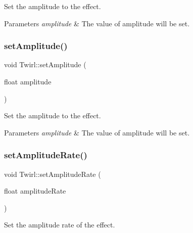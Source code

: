 Set the amplitude to the effect. 


\begin{DoxyParams}{Parameters}
{\em amplitude} & The value of amplitude will be set. \\
\hline
\end{DoxyParams}
\mbox{\label{classTwirl_abfc08e832e96fcddce09d0e26c84cf91}} 
\subsubsection{\texorpdfstring{set\+Amplitude()}{setAmplitude()}\hspace{0.1cm}{\footnotesize\ttfamily [2/2]}}
{\footnotesize\ttfamily void Twirl\+::set\+Amplitude (\begin{DoxyParamCaption}\item[{float}]{amplitude }\end{DoxyParamCaption})\hspace{0.3cm}{\ttfamily [inline]}}



Set the amplitude to the effect. 


\begin{DoxyParams}{Parameters}
{\em amplitude} & The value of amplitude will be set. \\
\hline
\end{DoxyParams}
\mbox{\label{classTwirl_a498a1b1fee7b27570130b6c19ca67b38}} 
\subsubsection{\texorpdfstring{set\+Amplitude\+Rate()}{setAmplitudeRate()}\hspace{0.1cm}{\footnotesize\ttfamily [1/2]}}
{\footnotesize\ttfamily void Twirl\+::set\+Amplitude\+Rate (\begin{DoxyParamCaption}\item[{float}]{amplitude\+Rate }\end{DoxyParamCaption})\hspace{0.3cm}{\ttfamily [inline]}}



Set the amplitude rate of the effect. 


